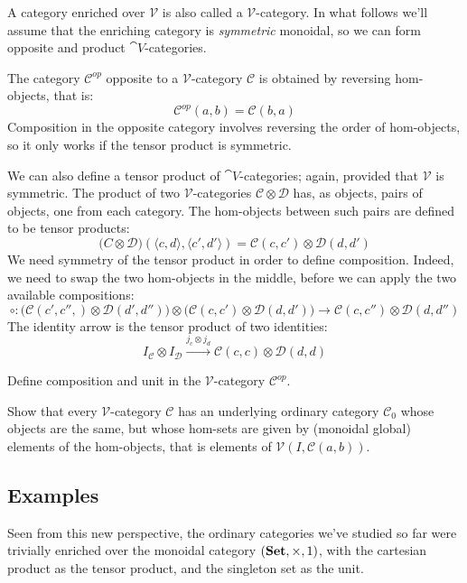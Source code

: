 \documentclass[DaoFP]{subfiles}
\begin{document}
A category enriched over $\mathcal V$ is also called a $\mathcal V$-category. In what follows we'll assume that the enriching category is \emph{symmetric} monoidal, so we can form opposite and product $\cat V$-categories.


The category $\mathcal C^{op}$ opposite to a $\mathcal V$-category $\mathcal C$ is obtained by reversing hom-objects, that is:
\[ \mathcal C^{op}(a, b) = \mathcal C(b, a) \]
Composition in the opposite category involves reversing the order of hom-objects, so it only works if the tensor product is symmetric.

We can also define a tensor product of $\cat V$-categories; again, provided that $\mathcal V$ is symmetric. The product of two $\mathcal V$-categories $\mathcal C \otimes \mathcal D$ has, as objects, pairs of objects, one from each category. The hom-objects between such pairs are defined to be tensor products:
\[ \mathcal (C \otimes \mathcal D) (\langle c, d \rangle, \langle c', d' \rangle) = \mathcal C(c, c') \otimes \mathcal D (d, d') \]
We need symmetry of the tensor product in order to define composition. Indeed, we need to swap the two hom-objects in the middle, before we can apply the two available compositions:
\[ \circ \colon  \big(\mathcal C(c', c'',) \otimes \mathcal D (d', d'')\big) \otimes \big( \mathcal C(c, c') \otimes \mathcal D (d, d')\big) \to  \mathcal C(c, c'') \otimes \mathcal D (d, d'') \]
The identity arrow is the tensor product of two identities:
\[ I_{\mathcal C} \otimes I_{\mathcal D} \xrightarrow{j_c \otimes j_d} \mathcal C(c, c) \otimes \mathcal D (d, d) \]


\begin{exercise}
Define composition and unit in the $\mathcal V$-category $\mathcal C^{op}$.
\end{exercise}

\begin{exercise}
Show that every $\mathcal V$-category $\mathcal C$ has an underlying ordinary category $\mathcal C_0$ whose objects are the same, but whose hom-sets are given by (monoidal global) elements of the hom-objects, that is elements of  $\mathcal V(I, \mathcal C(a, b))$.
\end{exercise}

\subsection{Examples}

Seen from this new perspective, the ordinary categories we've studied so far were trivially enriched over the monoidal category $(\mathbf{Set}, \times, 1)$, with the cartesian product as the tensor product, and the singleton set as the unit. 
\end{document}
